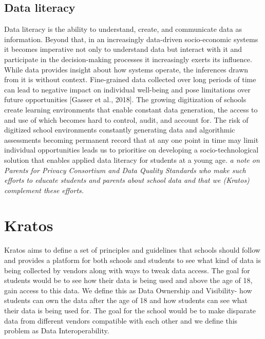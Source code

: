 \documentclass{article}
\begin{document}
\subsection{Data literacy}
Data literacy is the ability to understand, create, and communicate data as information. Beyond that, in an increasingly data-driven socio-economic systems it becomes imperative not only to understand data but interact with it and participate in the decision-making processes it increasingly exerts its influence. While data provides insight about how systems operate, the inferences drawn from it is without context. Fine-grained data collected over long periods of time can lead to negative impact on individual well-being and pose limitations over future opportunities [Gasser et al., 2018]. The growing digitization of schools create learning environments that enable constant data generation, the access to and use of which becomes hard to control, audit, and account for. The risk of digitized school environments constantly generating data and algorithmic assessments becoming permanent record that at any one point in time may limit individual opportunities leads us to prioritise on developing a socio-technological solution that enables applied data literacy for students at a young age. \textit{a note on Parents for Privacy Consortium and Data Quality Standards who make such efforts to educate students and parents about school data and that we (Kratos) complement these efforts.}

\section{Kratos}
Kratos aims to define a set of principles and guidelines that schools should follow and provides a platform for both schools and students to see what kind of data is being collected by vendors along with ways to tweak data access. The goal for students would be to see how their data is being used and above the age of 18, gain access to this data. We define this as Data Ownership and Visibility- how students can own the data after the age of 18 and how students can see what their data is being used for. The goal for the school would be to make disparate data from different vendors compatible with each other and we define this problem as Data Interoperability.
\end{document}
